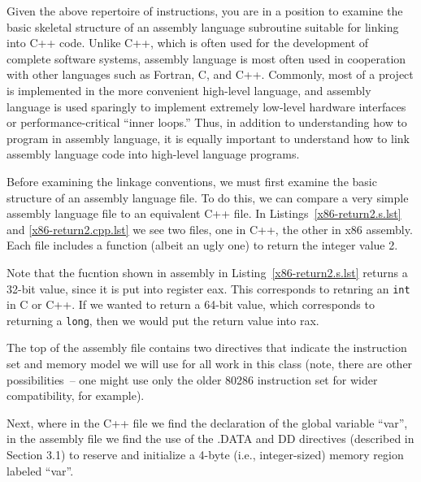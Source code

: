 Given the above repertoire of instructions, you are in a position to
examine the basic skeletal structure of an assembly language
subroutine suitable for linking into C++ code. Unlike C++, which is
often used for the development of complete software systems, assembly
language is most often used in cooperation with other languages such
as Fortran, C, and C++. Commonly, most of a project is implemented in
the more convenient high-level language, and assembly language is used
sparingly to implement extremely low-level hardware interfaces or
performance-critical ``inner loops.'' Thus, in addition to
understanding how to program in assembly language, it is equally
important to understand how to link assembly language code into
high-level language programs.

Before examining the linkage conventions, we must first examine the
basic structure of an assembly language file. To do this, we can
compare a very simple assembly language file to an equivalent C++
file. In Listings~\ref{x86-return2.s.lst} and \ref{x86-return2.cpp.lst} we see
two files, one in C++, the other in x86 assembly. Each file includes a
function (albeit an ugly one) to return the integer value 2.

Note that the fucntion shown in assembly in
Listing~\ref{x86-return2.s.lst} returns a 32-bit value, since it is
put into register eax.  This corresponds to retnring an {\tt int} in C
or C++.  If we wanted to return a 64-bit value, which corresponds to
returning a {\tt long}, then we would put the return value into rax.

The top of the assembly file contains two directives that indicate the
instruction set and memory model we will use for all work in this
class (note, there are other possibilities~-- one might use only the
older 80286 instruction set for wider compatibility, for example).

Next, where in the C++ file we find the declaration of the global
variable ``var'', in the assembly file we find the use of the .DATA
and DD directives (described in Section 3.1) to reserve and initialize
a 4-byte (i.e., integer-sized) memory region labeled ``var''.

\begin{figure}

\vspace{-0.25in}\end{figure}


